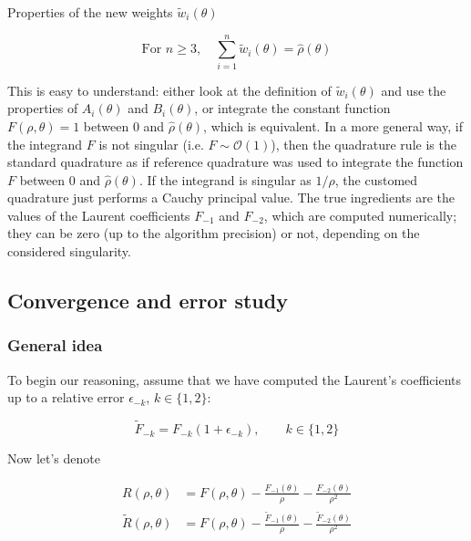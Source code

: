 ﻿\documentclass{article}
\begin{document}
\begin{remark} Properties of the new weights $\widetilde w_i(\theta)$
    
  \begin{equation}
    \text{For } n \geq 3, \quad
    \sum_{i=1}^{n} \widetilde w_i(\theta) = \hat\rho(\theta)
  \end{equation}

  This is easy to understand: either look at the definition of $\widetilde w_i(\theta)$ and use the properties of $A_i(\theta)$ and $B_i(\theta)$, or integrate the constant function $F(\rho, \theta) = 1$ between $0$ and $\hat\rho(\theta)$, which is equivalent. In a more general way, if the integrand $F$ is not singular (i.e. $F \sim \mathcal O(1)$), then the quadrature rule is the standard quadrature as if reference quadrature was used to integrate the function $F$ between $0$ and $\hat\rho(\theta)$. If the integrand is singular as $1/\rho$, the customed quadrature just performs a Cauchy principal value. The true ingredients are the values of the Laurent coefficients $F_{-1}$ and $F_{-2}$, which are computed numerically; they can be zero (up to the algorithm precision) or not, depending on the considered singularity.
  
\end{remark}

\subsection{Convergence and error study}

\subsubsection{General idea}
\label{sec:bernstein-R}

To begin our reasoning, assume that we have computed the Laurent's coefficients up to a relative error $\epsilon_{-k}$, $k\in\{1, 2\}$:

\begin{equation}
  \widetilde F_{-k} = F_{-k}(1+\epsilon_{-k}), \qquad k\in\{1, 2\}
\end{equation}

Now let's denote

\begin{align}
  R(\rho, \theta) & = F(\rho, \theta) - \frac{F_{-1}(\theta)}{\rho} - \frac{F_{-2}(\theta)}{\rho^2} \\
\widetilde R(\rho, \theta) & = F(\rho, \theta) - \frac{\widetilde F_{-1}(\theta)}{\rho} - \frac{\widetilde F_{-2}(\theta)}{\rho^2} \\
\end{align}
\end{document}

